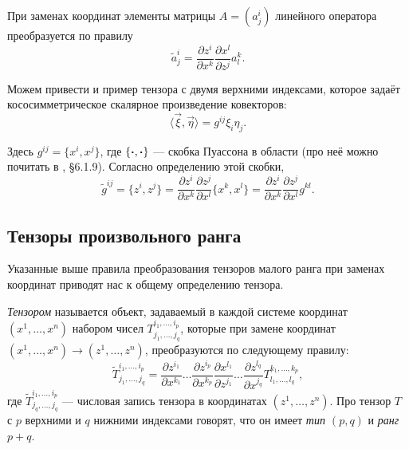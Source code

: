 \begin{theorem}
	При заменах координат элементы матрицы $A = (a^i_j)$ линейного оператора преобразуется по правилу
	\[
		\tilde{a}^i_j = \frac{\partial z^i}{\partial x^k}\frac{\partial x^l}{\partial z^j}a^k_l.
	\]
\end{theorem}

Можем привести и пример тензора с двумя верхними индексами, которое задаёт кососимметрическое скалярное произведение ковекторов:
\[
	\langle\vec{\xi}, \vec{\eta}\rangle = g^{ij}\xi_i\eta_j.
\]

Здесь $g^{ij} = \{x^i, x^j\}$, где $\{\boldsymbol{\cdot}, \boldsymbol{\cdot}\}$ --- скобка Пуассона в области (про неё можно почитать в \cite{NT14}, \S 6{.}1{.}9). Согласно определению этой скобки,
\[
	\tilde{g}^{ij} = \{z^i, z^j\} = \frac{\partial z^i}{\partial x^k}\frac{\partial z^j}{\partial x^l}\{x^k, x^l\} = \frac{\partial z^i}{\partial x^k}\frac{\partial z^j}{\partial x^l}g^{kl}.
\]

\subsection{Тензоры произвольного ранга}

Указанные выше правила преобразования тензоров малого ранга при заменах координат приводят нас к общему определению тензора.

\begin{definition}
	\textit{Тензором} называется объект, задаваемый в каждой системе координат $(x^1, \ldots, x^n)$ набором чисел $T^{i_1, \ldots, i_p}_{j_1, \ldots, j_q}$, которые при замене координат $(x^1, \ldots, x^n) \to (z^1, \ldots, z^n)$, преобразуются по следующему правилу:
	\[
		\widetilde{T}^{i_1, \ldots, i_p}_{j_1, \ldots, j_q} = \frac{\partial z^{i_1}}{\partial x^{k_1}}\ldots\frac{\partial z^{i_p}}{\partial x^{k_p}}\frac{\partial x^{l_1}}{\partial z^{j_1}}\ldots\frac{\partial z^{l_q}}{\partial x^{j_q}}T^{k_1, \ldots, k_p}_{l_1, \ldots, l_q},
	\]
	где $\widetilde{T}^{i_1, \ldots, i_p}_{j_q, \ldots, j_q}$ --- числовая запись тензора в координатах $(z^1, \ldots, z^n)$. Про тензор $T$ с $p$ верхними и $q$ нижними индексами говорят, что он имеет \textit{тип $(p, q)$} и \textit{ранг $p + q$}.
\end{definition}

